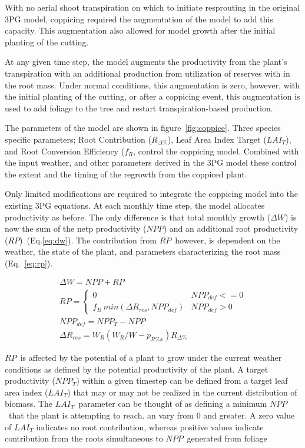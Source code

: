 \documentclass[10pt]{article}
\newcommand{\LAIt}{\ensuremath{LAI_{T}}}
\newcommand{\NPPdef}{\ensuremath{NPP_{def}}}
\newcommand{\NPPt}{\ensuremath{NPP_{T}}}
\newcommand{\NPP}{\ensuremath{NPP}}
\newcommand{\RP}{\ensuremath{RP}}
\newcommand{\Rdp}{\ensuremath{R_{\Delta\%}}}
\newcommand{\WR}{\ensuremath{W_R}}
\newcommand{\W}{\ensuremath{W}}
\newcommand{\dRres}{\ensuremath{\Delta R_{res}}}
\newcommand{\dW}{\ensuremath{\Delta W}}
\newcommand{\fR}{\ensuremath{f_R}}
\newcommand{\pRx}{\ensuremath{p_{R\%x}}}
\begin{document}
With no aerial shoot transpiration on which to initiate resprouting in the
original 3PG model, coppicing required the augmentation of the model to add this
capacity. This augmentation also allowed for model growth after the initial
planting of the cutting.

At any given time step, the model augments the productivity from the plant’s
transpiration with an additional production from utilization of reserves with in
the root mass. Under normal conditions, this augmentation is zero, however, with
the initial planting of the cutting, or after a coppicing event, this
augmentation is used to add foliage to the tree and restart transpiration-based
production.

The parameters of the model are shown in figure~\ref{fig:coppice}. Three species
specific parameters; Root Contribution (\Rdp), Leaf Area Index Target
(\LAIt), and Root Conversion Efficiency (\fR, control the coppicing
model. Combined with the input weather, and other parameters derived in the 3PG
model these control the extent and the timing of the regrowth from the coppiced
plant.

Only limited modifications are required to integrate the coppicing model into
the existing 3PG equations. At each monthly time step, the model allocates
productivity as before. The only difference is that total monthly growth (\dW) is
now the sum of the netp productivity (\NPP) and an additional root productivity
(\RP)~(Eq.\ref{eq:dw}). The contribution from \RP~however, is dependent on the weather, the state
of the plant, and parameters characterizing the root mass (Eq.~\ref{eq:rp}).

 \begin{align}
 \dW=\NPP+\RP \label{eq:dw} \\
 \RP = \begin{cases} 0 & \NPPdef <=0 \\
 \fR ~ min (\dRres ,\NPPdef) & \NPPdef > 0  
 \end{cases} \label{eq:rp}\\
 \NPPdef = \NPPt-\NPP \label{eq:nppdef}\\
 \dRres = \WR(\WR/\W - \pRx)\Rdp \label{eq:dRres}
 \end{align}

\RP~is affected by the potential of a plant to grow under the current weather
conditions as defined by the potential productivity of the plant. A target
productivity (\NPPt) within a given timestep can be defined from a target leaf
area index (\LAIt) that may or may not be realized in the current distribution of
biomass. The \LAIt~parameter can be thought of as defining a minimum \NPP~that the
plant is attempting to reach. an vary from 0 and greater. A zero value of \LAIt
indicates no root contribution, whereas positive values indicate contribution
from the roots simultaneous to \NPP~generated from foliage
\end{document}
